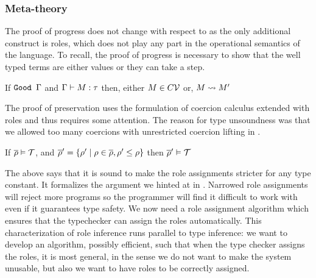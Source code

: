 \documentclass[screen,nonacm]{acmart}
\begin{document}
\subsubsection{Meta-theory}\label{sec:sfr-metatheory}
The proof of progress does not change with respect to \SFC as the only additional construct is roles, which does not play any part in the operational semantics of the language. To recall, the proof of progress is necessary to show that the well typed terms are either values or they can take a step.

\begin{theorem}\label{lem:sfr-progress}
 If $\texttt{Good~}\Gamma$ and $\Gamma \vdash M : \tau$ then, either $M \in C\mathcal{V}$ or, $M \rightsquigarrow M'$
\end{theorem}

The proof of preservation uses the formulation of coercion calculus extended with roles and thus requires some attention. The reason for type unsoundness was that we allowed too many coercions with unrestricted coercion lifting in \SFC.

\begin{lemma}\label{lem:role-narrowing}
If $\overline{\rho} \mathrel{\vDash} \mathcal{T}$, and $\overline{\rho}' = \{\rho' \mid \rho \in \overline{\rho}, \rho' \leq \rho\}$ then $\overline{\rho}' \mathrel{\vDash} \mathcal{T}$
\end{lemma}

The above  says that it is sound to make the role assignments stricter for any type constant. It formalizes the argument we hinted at in . Narrowed role assignments will reject more programs so the programmer will find it difficult to work with even if it guarantees type safety.
We now need a role assignment algorithm which ensures that the typechecker can assign the roles automatically. This characterization of role inference runs parallel to type inference: we want to develop an algorithm, possibly efficient, such that when the type checker assigns the roles, it is most general, in the sense we do not want to make the system unusable, but also we want to have roles to be correctly assigned.
\end{document}
